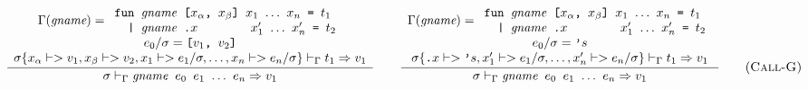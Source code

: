 \documentclass[10pt]{../sigplanconf}
\newcommand{\nfrac}[2]{\frac{\displaystyle{#1}}{\displaystyle{#2}}}
\newcommand{\tagsc}[1]{\tag{\scshape #1}}
\begin{document}
\begin{figure}
\begin{equation}
\hspace{-0.7cm}
  \nfrac{
    \begin{array}{c}
      \Gamma(\textit{gname}) =
      \begin{array}{l}
        \texttt{fun \textit{\rmfamily gname} [$x_\alpha$, $x_\beta$] $x_1$ $\ldots$ $x_n$ = $t_1$} \\
        \texttt{\ \ | \textit{\rmfamily gname}\ \texttt{.}$x$ \hspace{1.1cm} $x_1'$ $\ldots$ $x_n'$ = $t_2$} \\
      \end{array} \\
      e_0/\sigma = \texttt{[$v_1$, $v_2$]} \\
      \sigma\{x_\alpha |-> v_1, x_\beta |-> v_2, x_1 |-> e_1/\sigma, \ldots, x_n |-> e_n/\sigma\} |-_\Gamma t_1 => v_1
    \end{array}
  }{
    \sigma |-_\Gamma \texttt{\textit{\rmfamily gname} $e_0$ $e_1$ $\ldots$ $e_n$} => v_1
  }
\qquad
  \nfrac{
    \begin{array}{c}
      \Gamma(\textit{gname}) =
      \begin{array}{l}
        \texttt{fun \textit{\rmfamily gname} [$x_\alpha$, $x_\beta$] $x_1$ $\ldots$ $x_n$ = $t_1$} \\
        \texttt{\ \ | \textit{\rmfamily gname}\ \texttt{.}$x$ \hspace{1.1cm} $x_1'$ $\ldots$ $x_n'$ = $t_2$} \\
      \end{array} \\
      e_0/\sigma = \texttt{'}s \\
      \sigma\{\texttt{.}x |-> \texttt{'}s, x_1' |-> e_1/\sigma, \ldots, x_n' |-> e_n/\sigma\} |-_\Gamma t_1 => v_1
    \end{array}
  }{
    \sigma |-_\Gamma \texttt{\textit{\rmfamily gname} $e_0$ $e_1$ $\ldots$ $e_n$} => v_1
  }
  \tagsc{Call-G}
\end{equation}


\end{figure}
\end{document}

